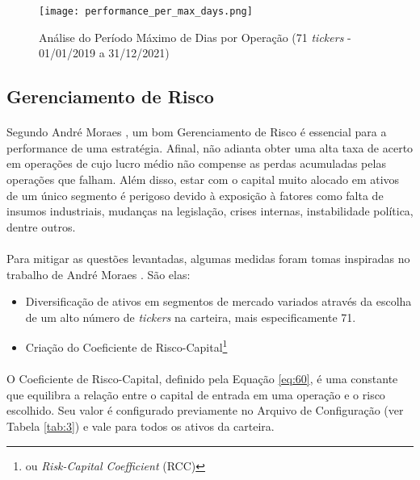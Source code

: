 \begin{figure}[!htb]
    \texttt{[image: performance\_per\_max\_days.png]}
    \centering
    \caption{Análise do Período Máximo de Dias por Operação (71 \textit{tickers} - 01/01/2019 a 31/12/2021)}
    \label{fig:740}
\end{figure}



\FloatBarrier
\subsection{Gerenciamento de Risco}
\label{sub:risk_man}

\paragraph{} Segundo André Moraes \cite{moraes2007se}, um bom Gerenciamento de Risco é essencial para a performance de uma estratégia. Afinal, não adianta obter uma alta taxa de acerto em operações de cujo lucro médio não compense as perdas acumuladas pelas operações que falham. Além disso, estar com o capital muito alocado em ativos de um único segmento é perigoso devido à exposição à fatores como falta de insumos industriais, mudanças na legislação, crises internas, instabilidade política, dentre outros.

\paragraph{} Para mitigar as questões levantadas, algumas medidas foram tomas inspiradas no trabalho de André Moraes \cite{moraes2007se}. São elas:

\begin{itemize}
    \item Diversificação de ativos em segmentos de mercado variados através da escolha de um alto número de \textit{tickers} na carteira, mais especificamente 71.
    \item Criação do Coeficiente de Risco-Capital\footnote{ou \textit{Risk-Capital Coefficient} (RCC)}
\end{itemize}

\paragraph{} O Coeficiente de Risco-Capital, definido pela Equação \ref{eq:60}, é uma constante que equilibra a relação entre o capital de entrada em uma operação e o risco escolhido. Seu valor é configurado previamente no Arquivo de Configuração (ver Tabela \ref{tab:3}) e vale para todos os ativos da carteira.


